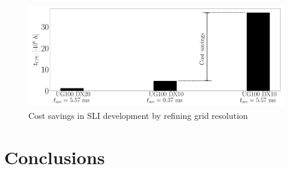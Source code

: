 \clearpage

\begin{figure}[ht]
   \centering
   \includegraphics[scale=0.215]{./part2_developments/figures_ch5_resolved_JICF/SLI_cost_for_convergence/cost_savings_simulations}
   \caption{Cost savings in SLI development by refining grid resolution}
   \label{fig:SLI_cost_convergence_savings}
\end{figure}


\section{Conclusions}

